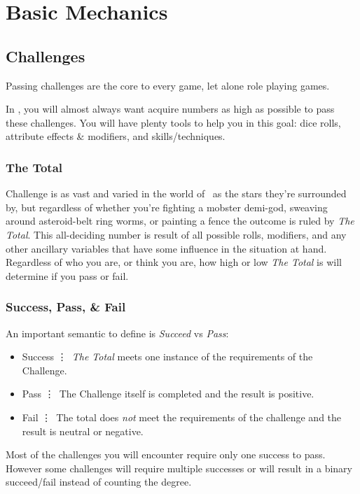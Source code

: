 \part{Basic Mechanics}
\chapter{Challenges}
Passing challenges are the core to every game, let alone role playing games. 

In \gametitlemini, you will almost always want acquire numbers as
high as possible to pass these challenges. You will have plenty tools
to help you in this goal: dice rolls, attribute effects \& modifiers,
and skills/techniques. 

\section{The Total}
Challenge is as vast and varied in the world of \gametitlemini\ as the stars they're surrounded by, but regardless of whether you're fighting a mobster demi-god, sweaving around asteroid-belt ring worms, or painting a fence the outcome is  ruled by \emph{The Total}. This all-deciding number is result of all possible rolls, modifiers, and any other ancillary variables that have some influence in the situation at hand. Regardless of who you are, or think you are, how high or low \emph{The Total} is will determine if you pass or fail.

\section{Success, Pass, \& Fail}
An important semantic to define is \emph{Succeed} vs \emph{Pass}:

\begin{itemize}
\item Success \vdots\ \emph{The Total} meets one instance of the requirements of the Challenge.
\item Pass \vdots\ The Challenge itself is completed and the result is positive.
\item Fail \vdots\ The total does \emph{not} meet the requirements of the challenge and the result is neutral or negative.
\end{itemize}
Most of the challenges you will encounter require only one success
to pass. However some challenges will require multiple successes or
will result in a binary succeed/fail instead of counting the degree.

